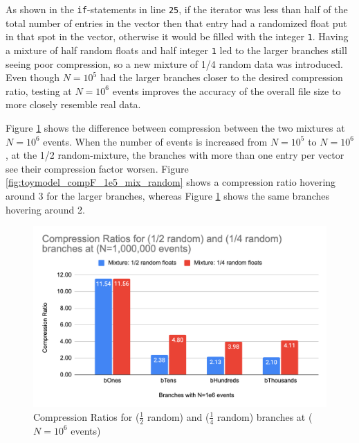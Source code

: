 As shown in the \verb|if|-statements in line \verb|25|, if the iterator was less than half of the total number of entries in the vector then that entry had a randomized float put in that spot in the vector, otherwise it would be filled with the integer \verb|1|.
Having a mixture of half random floats and half integer \verb|1| led to the larger branches still seeing poor compression, so a new mixture of 1/4 random data was introduced. 
Even though $N=10^5$ had the larger branches closer to the desired compression ratio, testing at $N=10^6$ events improves the accuracy of the overall file size to more closely resemble real data.

Figure \ref{fig:toymodel_compF_1e6_mix_random} shows the difference between compression between the two mixtures at $N=10^6$ events. 
When the number of events is increased from $N=10^5$ to $N=10^6$, at the 1/2 random-mixture, the branches with more than one entry per vector see their compression factor worsen. 
Figure \ref{fig:toymodel_compF_1e5_mix_random} shows a compression ratio hovering around 3 for the larger branches, whereas Figure \ref{fig:toymodel_compF_1e6_mix_random} shows the same branches hovering around 2. 

\begin{figure}[h]
    \centering
    \includegraphics[width=.8\textwidth]{content/toymodel_content/Compression Ratios for (1_2 random) and (1_4 random) branches at (N=1,000,000 events).png}
    \caption{Compression Ratios for ($\frac{1}{2}$ random) and ($\frac{1}{4}$ random) branches at ($N=10^6$ events)}
    \label{fig:toymodel_compF_1e6_mix_random}
\end{figure}

